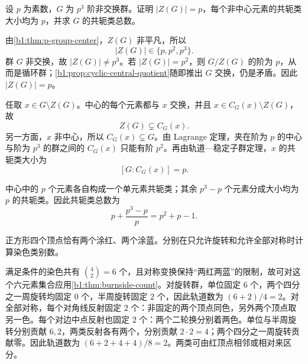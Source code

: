 \begin{exercise}\label{b1:ex:04-nonabelian-p3}
	设 \(p\) 为素数，\(G\) 为 \(p^3\) 阶非交换群。证明 \(|Z(G)|=p\)，每个非中心元素的共轭类大小均为 \(p\)，并求 \(G\) 的共轭类总数。
\end{exercise}
\begin{solution}
	由\cref{b1:thm:p-group-center}，\(Z(G)\) 非平凡，所以
	\[
		|Z(G)|\in\{p,p^2,p^3\}.
	\]
	群 \(G\) 非交换，故 \(|Z(G)|\neq p^3\)。若 \(|Z(G)|=p^2\)，则 \(G/Z(G)\) 的阶为 \(p\)，从而是循环群；\cref{b1:prop:cyclic-central-quotient}随即推出 \(G\) 交换，仍是矛盾。因此 \(|Z(G)|=p\)。

	任取 \(x\in G\setminus Z(G)\)。中心的每个元素都与 \(x\) 交换，并且 \(x\in C_G(x)\setminus Z(G)\)，故
	\[
		Z(G)\subsetneq C_G(x).
	\]
	另一方面，\(x\) 非中心，所以 \(C_G(x)\subsetneq G\)。由 Lagrange 定理，夹在阶为 \(p\) 的中心与阶为 \(p^3\) 的群之间的 \(C_G(x)\) 只能有阶 \(p^2\)。再由轨道—稳定子群定理，\(x\) 的共轭类大小为
	\[
		[G:C_G(x)]=p.
	\]

	中心中的 \(p\) 个元素各自构成一个单元素共轭类；其余 \(p^3-p\) 个元素分成大小均为 \(p\) 的共轭类。因此共轭类总数为
	\[
		p+\frac{p^3-p}{p}=p^2+p-1.
	\]
\end{solution}

\begin{exercise}\label{b1:ex:04-5}
	正方形四个顶点恰有两个涂红、两个涂蓝。分别在只允许旋转和允许全部对称时计算染色类别数。
\end{exercise}
\begin{solution}
	满足条件的染色共有 \(\binom42=6\) 个，且对称变换保持“两红两蓝”的限制，故可对这个六元素集合应用\cref{b1:thm:burnside-count}。对旋转群，单位固定 \(6\) 个，两个四分之一周旋转均固定 \(0\) 个，半周旋转固定 \(2\) 个，因此轨道数为 \((6+2)/4=2\)。对全部对称，每个对角线反射固定 \(2\) 个：非固定的两个顶点同色，另外两个顶点取另一色。每个对边中点反射也固定 \(2\) 个：两个二轮换分别着两色。单位与半周旋转分别贡献 \(6,2\)，两类反射各有两个，分别贡献 \(2\cdot2=4\)；两个四分之一周旋转贡献零。因此轨道数为 \((6+2+4+4)/8=2\)。两类可由红顶点相邻或相对来区分。
\end{solution}

